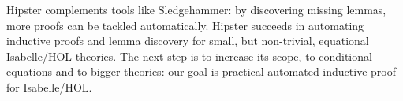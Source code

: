 Hipster complements tools like Sledgehammer: by discovering missing
lemmas, more proofs can be tackled automatically. Hipster succeeds in
automating inductive proofs and lemma discovery for small, but
non-trivial, equational Isabelle/HOL theories. The next step is to
increase its scope, to conditional equations and to bigger theories:
our goal is practical automated inductive proof for Isabelle/HOL.

